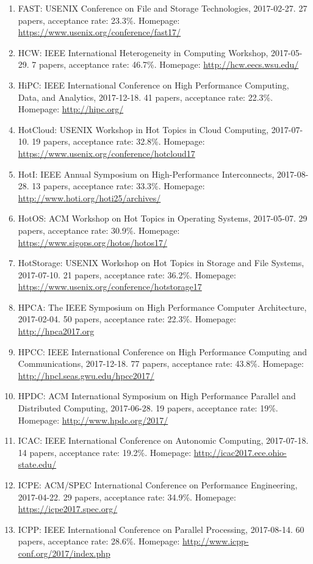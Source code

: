 \documentclass{article}
\begin{document}
\begin{enumerate}
\item FAST: USENIX Conference on File and Storage Technologies, 2017-02-27. 27 papers, acceptance rate: 23.3\%. Homepage: \url{https://www.usenix.org/conference/fast17/}
\item HCW: IEEE International Heterogeneity in Computing Workshop, 2017-05-29. 7 papers, acceptance rate: 46.7\%. Homepage: \url{http://hcw.eecs.wsu.edu/}
\item HiPC: IEEE International Conference on High Performance Computing, Data, and Analytics, 2017-12-18. 41 papers, acceptance rate: 22.3\%. Homepage: \url{http://hipc.org/}
\item HotCloud: USENIX Workshop in Hot Topics in Cloud Computing, 2017-07-10. 19 papers, acceptance rate: 32.8\%. Homepage: \url{https://www.usenix.org/conference/hotcloud17}
\item HotI: IEEE Annual Symposium on High-Performance Interconnects, 2017-08-28. 13 papers, acceptance rate: 33.3\%. Homepage: \url{http://www.hoti.org/hoti25/archives/}
\item HotOS: ACM Workshop on Hot Topics in Operating Systems, 2017-05-07. 29 papers, acceptance rate: 30.9\%. Homepage: \url{https://www.sigops.org/hotos/hotos17/}
\item HotStorage: USENIX Workshop on Hot Topics in Storage and File Systems, 2017-07-10. 21 papers, acceptance rate: 36.2\%. Homepage: \url{https://www.usenix.org/conference/hotstorage17}
\item HPCA: The IEEE Symposium on High Performance Computer Architecture, 2017-02-04. 50 papers, acceptance rate: 22.3\%. Homepage: \url{http://hpca2017.org}
\item HPCC: IEEE International Conference on High Performance Computing and Communications, 2017-12-18. 77 papers, acceptance rate: 43.8\%. Homepage: \url{http://hpcl.seas.gwu.edu/hpcc2017/}
\item HPDC: ACM International Symposium on High Performance Parallel and Distributed Computing, 2017-06-28. 19 papers, acceptance rate: 19\%. Homepage: \url{http://www.hpdc.org/2017/}
\item ICAC: IEEE International Conference on Autonomic Computing, 2017-07-18. 14 papers, acceptance rate: 19.2\%. Homepage: \url{http://icac2017.ece.ohio-state.edu/}
\item ICPE: ACM/SPEC International Conference on Performance Engineering, 2017-04-22. 29 papers, acceptance rate: 34.9\%. Homepage: \url{https://icpe2017.spec.org/}
\item ICPP: IEEE International Conference on Parallel Processing, 2017-08-14. 60 papers, acceptance rate: 28.6\%. Homepage: \url{http://www.icpp-conf.org/2017/index.php}

\end{enumerate}
\end{document}
